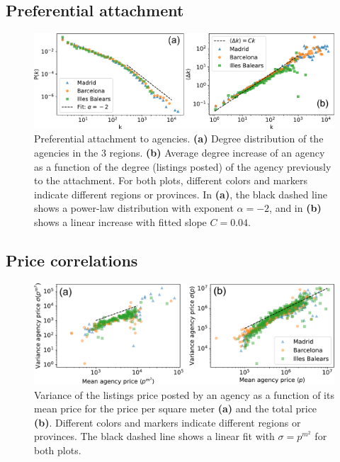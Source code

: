 \subsection{Preferential attachment}

\begin{figure}
    \label{fig:panel_degree}
    \centering
    \includegraphics[width =\textwidth]{Figs/Idealista_dynamics/panel_degree.pdf}
	\caption[Preferential attachment to agencies.]{Preferential attachment to agencies. \textbf{(a)} Degree distribution of the agencies in the 3 regions. \textbf{(b)} Average degree increase of an agency as a function of the degree (listings posted) of the agency previously to the attachment. For both plots, different colors and markers indicate different regions or provinces. In \textbf{(a)}, the black dashed line shows a power-law distribution with exponent $\alpha  =-2$, and in \textbf{(b)} shows a linear increase with fitted slope $C = 0.04$.}
\end{figure}

\subsection{Price correlations}

\begin{figure}
    \label{fig:sigma_price}
    \centering
    \includegraphics[width =\textwidth]{Figs/Idealista_dynamics/labeled_sigma_price.pdf}
	\caption[Variance of the agency price vs mean agency price.]{Variance of the listings price posted by an agency as a function of its mean price for the price per square meter \textbf{(a)} and the total price \textbf{(b)}. Different colors and markers indicate different regions or provinces. The black dashed line shows a linear fit with $\sigma = p^{{m}^2}$ for both plots.}
\end{figure}

